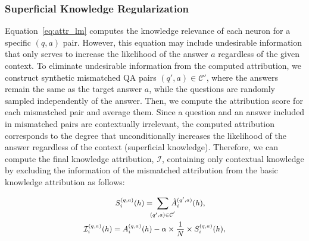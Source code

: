 \subsubsection{Superficial Knowledge Regularization} Equation~\ref{eq:attr_lm} computes the knowledge relevance of each neuron for a specific $(q,a)$ pair.
However, this equation may include undesirable information that only serves to increase the likelihood of the answer $a$ regardless of the given context.
To eliminate undesirable information from the computed attribution, we construct synthetic mismatched QA pairs $(q',a) \in \mathcal{C}'$, where the answers remain the same as the target answer $a$, while the questions are randomly sampled independently of the answer.
Then, we compute the attribution score for each mismatched pair and average them.
Since a question and an answer included in mismatched pairs are contextually irrelevant, the computed attribution corresponds to the degree that unconditionally increases the likelihood of the answer regardless of the context (superficial knowledge).
Therefore, we can compute the final knowledge attribution, $\mathcal{I}$, containing only contextual knowledge by excluding the information of the mismatched attribution from the basic knowledge attribution as follows:



\vspace{-0.2cm}
\begin{equation}
\begin{aligned}
    \text{\small $S^{(q,a)}_{i}(h) = \hspace{-0.2cm} \sum_{(q',a) \in \mathcal{C}^{'}}{\hspace{-0.25cm}\Tilde{A}^{(q',a)}_{i}(h)}$,}\:\:\:\:\:\:\:\:\:\:\:\\
    \text{\small $\mathcal{I}^{(q,a)}_{i}(h) = A^{(q,a)}_{i}(h) - \alpha \times \frac{1}{N} \times S^{(q,a)}_{i}(h)$,} \\
\end{aligned}
\label{eq:attr_regular}
\end{equation}
\vspace{-0.2cm}


